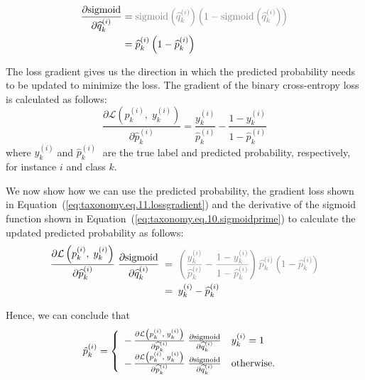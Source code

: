 \documentclass[review,1p,times,numbers]{elsarticle}
\begin{document}
\begin{align}
    \label{eq:taxonomy.eq.10.sigmoidprime}
    \frac{\partial{\text{sigmoid}}}{\partial{\widehat{q}_k^{(i)}}}
    & = \textcolor{gray}{\text{sigmoid}\left(\widehat{q}_k^{(i)}\right)\left(1-\text{sigmoid}\left(\widehat{q}_k^{(i)}\right)\right)}
    \\
    & = \widehat{p}_k^{(i)}\left(1-\widehat{p}_k^{(i)}\right)
\end{align}

The loss gradient gives us the direction in which the predicted probability needs to be updated to minimize the loss. The gradient of the binary cross-entropy loss is calculated as follows:
\begin{equation}
    \label{eq:taxonomy.eq.11.lossgradient}
    \frac{\partial \mathcal{L} \left( \widehat{p}_k^{(i)},\;y_k^{(i)}\right)}{\partial \widehat{p}_k^{(i)} }=\frac{y_k^{(i)}}{\widehat{p}_k^{(i)}}-\frac{1-y_k^{(i)}}{1-\widehat{p}_k^{(i)}}
\end{equation}
where $y_k^{(i)}\; $and $\widehat{p}_k^{(i)}\; $ are the true label and predicted probability, respectively, for instance $i $ and class $k $.

We now show how we can use the predicted probability, the gradient loss shown in Equation~(\ref{eq:taxonomy.eq.11.lossgradient}) and the derivative of the sigmoid function shown in Equation~(\ref{eq:taxonomy.eq.10.sigmoidprime}) to calculate the updated predicted probability as follows:
\begin{align}
    \label{eq:taxonomy.eq.12.newpredelement}
    \frac{\partial \mathcal{L}\left(p_k^{(i)},\; y_k^{(i)}\right)}{\partial \widehat{p}_k^{(i)} }\; \frac{\partial{\text{sigmoid}}}{\partial{\widehat{q}_k^{(i)}}}
    & \; = \; \textcolor{gray}{\left(\frac{y_k^{(i)}}{\widehat{p}_k^{(i)}}-\frac{1-y_k^{(i)}}{1-\widehat{p}_k^{(i)}}\right)\widehat{p}_k^{(i)}\left(1-\widehat{p}_k^{(i)}\right) }
    \\
    & \; = \; y_k^{(i)}-\widehat{p}_k^{(i)}
\end{align}

Hence, we can conclude that
\begin{equation}
    \label{eq:taxonomy.eq.13.newpred}
    \begin{array}{@{}l}
    \hat{p}_{k}^{(i)} = \left\{
        \begin{array}{ll}
            -\, \frac{\partial \mathcal{L}\left(p_k^{(i)},\;y_k^{(i)}\right)}{\partial \widehat{p}_k^{(i)} }\;{ \frac{\partial{\text{sigmoid}}}{\partial{\widehat{q}_k^{(i)}}}}
            &
            y_k^{(i)}=1
            \\
            -\,\frac{\partial \mathcal{L}\left(p_k^{(i)},\;y_k^{(i)}\right)}{\partial \widehat{p}_k^{(i)} }\; {\frac{\partial{\text{sigmoid}}}{\partial{\widehat{q}_k^{(i)}}}}
            &
            \text{otherwise.}
        \end{array}\right.
    \end{array}
\end{equation}
\end{document}

